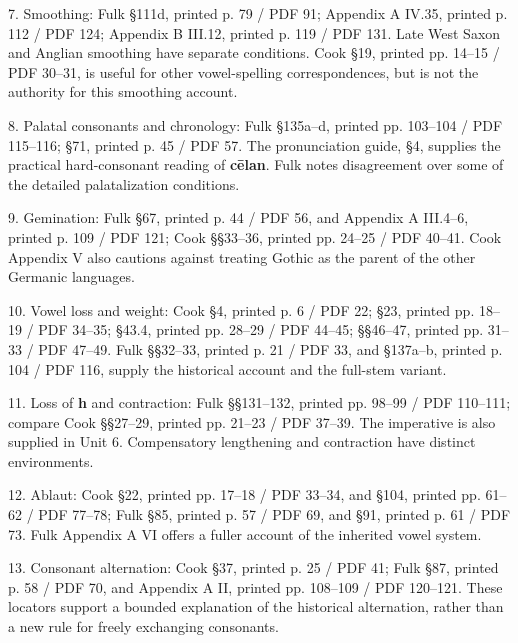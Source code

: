 7. Smoothing: Fulk §111d, printed p. 79 / PDF 91; Appendix A IV.35, printed p. 112 / PDF 124; Appendix B III.12, printed p. 119 / PDF 131. Late West Saxon and Anglian smoothing have separate conditions. Cook §19, printed pp. 14–15 / PDF 30–31, is useful for other vowel-spelling correspondences, but is not the authority for this smoothing account.\par
8. Palatal consonants and chronology: Fulk §135a–d, printed pp. 103–104 / PDF 115–116; §71, printed p. 45 / PDF 57. The pronunciation guide, §4, supplies the practical hard-consonant reading of \textbf{cēlan}. Fulk notes disagreement over some of the detailed palatalization conditions.\par
9. Gemination: Fulk §67, printed p. 44 / PDF 56, and Appendix A III.4–6, printed p. 109 / PDF 121; Cook §§33–36, printed pp. 24–25 / PDF 40–41. Cook Appendix V also cautions against treating Gothic as the parent of the other Germanic languages.\par
10. Vowel loss and weight: Cook §4, printed p. 6 / PDF 22; §23, printed pp. 18–19 / PDF 34–35; §43.4, printed pp. 28–29 / PDF 44–45; §§46–47, printed pp. 31–33 / PDF 47–49. Fulk §§32–33, printed p. 21 / PDF 33, and §137a–b, printed p. 104 / PDF 116, supply the historical account and the full-stem variant.\par
11. Loss of \textbf{h} and contraction: Fulk §§131–132, printed pp. 98–99 / PDF 110–111; compare Cook §§27–29, printed pp. 21–23 / PDF 37–39. The imperative is also supplied in Unit 6. Compensatory lengthening and contraction have distinct environments.\par
12. Ablaut: Cook §22, printed pp. 17–18 / PDF 33–34, and §104, printed pp. 61–62 / PDF 77–78; Fulk §85, printed p. 57 / PDF 69, and §91, printed p. 61 / PDF 73. Fulk Appendix A VI offers a fuller account of the inherited vowel system.\par
13. Consonant alternation: Cook §37, printed p. 25 / PDF 41; Fulk §87, printed p. 58 / PDF 70, and Appendix A II, printed pp. 108–109 / PDF 120–121. These locators support a bounded explanation of the historical alternation, rather than a new rule for freely exchanging consonants.\par

